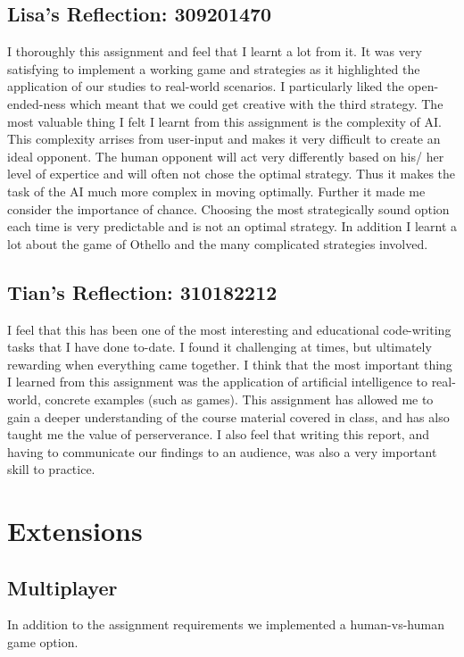 \documentclass[12pt]{article}
\begin{document}
\subsection{Lisa's Reflection: 309201470}
I thoroughly this assignment and feel that I learnt a lot from it. It was very satisfying to implement a working game and strategies as it highlighted the application of our studies to real-world scenarios. I particularly liked the open-ended-ness which meant that we could get creative with the third strategy. The most valuable thing I felt I learnt from this assignment is the complexity of AI. This complexity arrises from user-input and makes it very difficult to create an ideal opponent. The human opponent will act very differently based on his/ her level of expertice and will often not chose the optimal strategy. Thus it makes the task of the AI much more complex in moving optimally. Further it made me consider the importance of chance. Choosing the most strategically sound option each time is very predictable and is not an optimal strategy. In addition I learnt a lot about the game of Othello and the many complicated strategies involved.

\subsection{Tian's Reflection: 310182212}
I feel that this has been one of the most interesting and educational code-writing tasks that I have done to-date.
I found it challenging at times, but ultimately rewarding when everything came together. I think that the most
important thing I learned from this assignment was the application of artificial intelligence to real-world, concrete
examples (such as games). This assignment has allowed me to gain a deeper understanding of the course material
covered in class, and has also taught me the value of perserverance. I also feel that writing this report, and
having to communicate our findings to an audience, was also a very important skill to practice.

\section{Extensions}

\subsection{Multiplayer}
In addition to the assignment requirements we implemented a human-vs-human game option.
\end{document}
